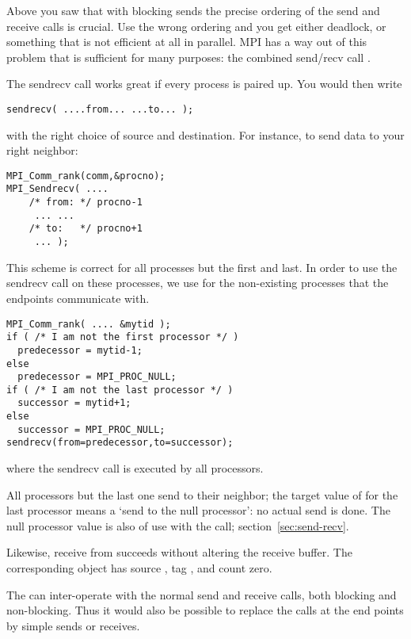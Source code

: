 Above you saw that with blocking sends the precise ordering of the
send and receive calls is crucial. Use the wrong ordering and you get
either deadlock, or something that is not efficient at all in
parallel. MPI has a way out of this problem that is sufficient for
many purposes: the combined send/recv call .

The sendrecv call works great if every process is paired up.
You would then write
\begin{lstlisting}
sendrecv( ....from... ...to... );
\end{lstlisting}
with the right choice of source and destination. For instance, to send
data to your right neighbor:
\begin{lstlisting}
MPI_Comm_rank(comm,&procno);
MPI_Sendrecv( .... 
    /* from: */ procno-1
     ... ... 
    /* to:   */ procno+1
     ... );
\end{lstlisting}
This scheme is correct for all processes but the first and last. 
In order to use the sendrecv call on these processes,
we use  for the non-existing
processes that the endpoints communicate with.
\begin{lstlisting}
MPI_Comm_rank( .... &mytid );
if ( /* I am not the first processor */ )
  predecessor = mytid-1;
else
  predecessor = MPI_PROC_NULL;
if ( /* I am not the last processor */ )
  successor = mytid+1;
else
  successor = MPI_PROC_NULL;
sendrecv(from=predecessor,to=successor);
\end{lstlisting}
where the sendrecv call is executed by all processors.

All processors but the last one send to their neighbor; the target
value of  for
the last processor means a `send to the null processor': no actual
send is done. 
The null processor value is also of use with the
 call; section~\ref{sec:send-recv}.

Likewise, receive from  succeeds without
altering the receive buffer.  The corresponding
 object has source
, tag , and
count zero.

\begin{remark}
  The  can inter-operate with
  the normal send and receive calls, both blocking and non-blocking.
  Thus it would also be possible to replace the 
  calls at the end points by simple sends or receives.
\end{remark}

